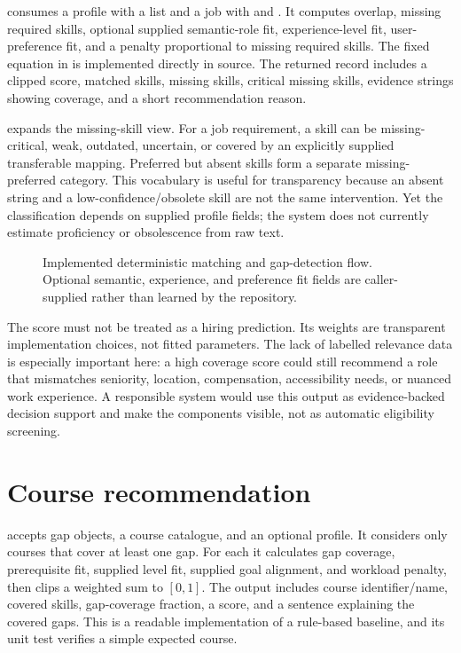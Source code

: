  consumes a profile with a  list and a job with  and . It computes overlap, missing required skills, optional supplied semantic-role fit, experience-level fit, user-preference fit, and a penalty proportional to missing required skills. The fixed equation in  is implemented directly in source. The returned record includes a clipped score, matched skills, missing skills, critical missing skills, evidence strings showing coverage, and a short recommendation reason.

 expands the missing-skill view. For a job requirement, a skill can be missing-critical, weak, outdated, uncertain, or covered by an explicitly supplied transferable mapping. Preferred but absent skills form a separate missing-preferred category. This vocabulary is useful for transparency because an absent string and a low-confidence/obsolete skill are not the same intervention. Yet the classification depends on supplied profile fields; the system does not currently estimate proficiency or obsolescence from raw text.

\begin{figure}[H]
\centering

\caption{Implemented deterministic matching and gap-detection flow. Optional semantic, experience, and preference fit fields are caller-supplied rather than learned by the repository.}
\label{fig:matching}
\end{figure}

The score must not be treated as a hiring prediction. Its weights are transparent implementation choices, not fitted parameters. The lack of labelled relevance data is especially important here: a high coverage score could still recommend a role that mismatches seniority, location, compensation, accessibility needs, or nuanced work experience. A responsible system would use this output as evidence-backed decision support and make the components visible, not as automatic eligibility screening.

\section{Course recommendation}

 accepts gap objects, a course catalogue, and an optional profile. It considers only courses that cover at least one gap. For each it calculates gap coverage, prerequisite fit, supplied level fit, supplied goal alignment, and workload penalty, then clips a weighted sum to $[0,1]$. The output includes course identifier/name, covered skills, gap-coverage fraction, a score, and a sentence explaining the covered gaps. This is a readable implementation of a rule-based baseline, and its unit test verifies a simple expected course.

